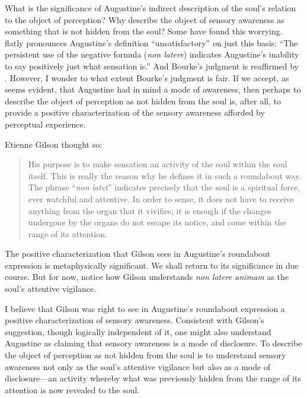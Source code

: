 \documentclass[12pt]{article}
\begin{document}
What is the significance of Augustine's indirect description of the soul's relation to the object of perception? Why describe the object of sensory awareness as something that is not hidden from the soul? Some have found this worrying. \citet[112]{Bourke:1947jk} flatly pronounces Augustine's definition ``unsatisfactory'' on just this basis: ``The persistent use of the negative formula (\emph{non latere}) indicates Augustine's inability to say positively just what sensation is.'' And Bourke's judgment is reaffirmed by \citet[104, n. 1]{McMahon:1947dn}. However, I wonder to what extent Bourke's judgment is fair. If we accept, as seems evident, that Augustine had in mind a mode of awareness, then perhaps to describe the object of perception as not hidden from the soul is, after all, to provide a positive characterization of the sensory awareness afforded by perceptual experience.  

Etienne Gilson thought so:
\begin{quote}
	His purpose is to make sensation an activity of the soul within the soul itself. This is really the reason why he defines it in such a roundabout way. The phrase ``\emph{non latet}'' indicates precisely that the soul is a spiritual force, ever watchful and attentive. In order to sense, it does not have to receive anything from the organ that it vivifies; it is enough if the changes undergone by the organs do not escape its notice, and come within the range of its attention. \citep[63]{Gilson:1961ec}
\end{quote}
The positive characterization that Gilson sees in Augustine's roundabout expression is metaphysically significant. We shall return to its significance in due course. But for now, notice how Gilson understands \emph{non latere animam} as the soul's attentive vigilance. 

I believe that Gilson was right to see in Augustine's roundabout expression a positive characterization of sensory awareness. Consistent with Gilson's suggestion, though logically independent of it, one might also understand Augustine as claiming that sensory awareness is a mode of disclosure. To describe the object of perception as not hidden from the soul is to understand sensory awareness not only as the soul's attentive vigilance but also as a mode of disclosure---an activity whereby what was previously hidden from the range of its attention is now revealed to the soul.
\end{document}
